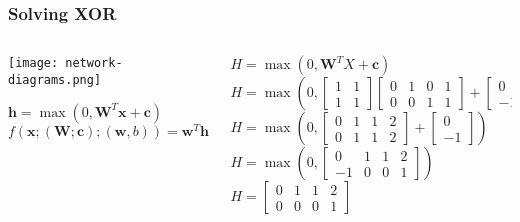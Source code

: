 \begin{frame}
\frametitle{Solving XOR}
\begin{columns}
\begin{column}{.4\textwidth}
\centering
\begin{center}
\texttt{[image: network-diagrams.png]}
\end{center}
$
\textbf{h} = \max(0, \textbf{W}^{T}\textbf{x} + \textbf{c})
$\\
$
f(\textbf{x}; (\textbf{W}; \textbf{c}); (\textbf{w}, b)) = \textbf{w}^{T} \textbf{h} + b
$
\end{column}
\begin{column}{.6\textwidth}
$
H = 
\max \left (
0,
\textbf{W}^T X + \textbf{c}
\right )
$\\

$
H = 
\max \left (0, 
\left [
\begin{array}{cc}
1 & 1 \\
1 & 1
\end{array}
\right ]
\left [
\begin{array}{cccc}
0 & 1 & 0 & 1 \\
0 & 0 & 1 & 1
\end{array}
\right ]
+
\left [
\begin{array}{c}
0 \\
-1
\end{array}
\right ]
\right )
$\\
$
H = 
\max \left (0, 
\left [
\begin{array}{cccc}
0 & 1 & 1 & 2 \\
0 & 1 & 1 & 2
\end{array}
\right ]
+
\left [
\begin{array}{c}
0 \\
-1
\end{array}
\right ]
\right )
$\\
$
H = 
\max \left (0, 
\left [
\begin{array}{cccc}
0 & 1 & 1 & 2 \\
-1 & 0 & 0 & 1
\end{array}
\right ]
\right )
$\\
$
H =
\left [
\begin{array}{cccc}
0 & 1 & 1 & 2 \\
0 & 0 & 0 & 1
\end{array}
\right ]
$
\end{column}
\end{columns}
\end{frame}

